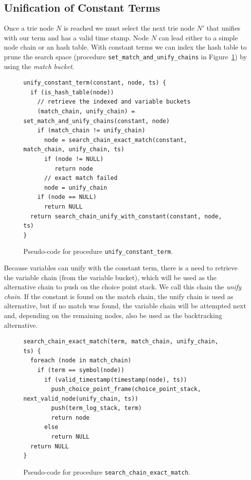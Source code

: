 \subsection{Unification of Constant Terms}

Once a trie node $N$ is reached we must select the next trie node $N'$ that unifies with our
term and has a valid time stamp. Node $N$ can lead either to a simple node chain or an hash table.
With constant terms we can index the hash table to prune the search space
(procedure \texttt{set\_match\_and\_unify\_chains} in Figure~\ref{fig:unify_constant_term})
by using the \textit{match bucket}.

\begin{figure}[ht]
\begin{Verbatim}
unify_constant_term(constant, node, ts) {
  if (is_hash_table(node))
    // retrieve the indexed and variable buckets
    (match_chain, unify_chain) = set_match_and_unify_chains(constant, node)
    if (match_chain != unify_chain)
      node = search_chain_exact_match(constant, match_chain, unify_chain, ts)
      if (node != NULL)
         return node
      // exact match failed
      node = unify_chain
    if (node == NULL)
      return NULL
  return search_chain_unify_with_constant(constant, node, ts)
}
\end{Verbatim}
\caption{Pseudo-code for procedure \texttt{unify\_constant\_term}.}
\label{fig:unify_constant_term}
\end{figure}

Because variables can unify with the constant term, there is a need to retrieve the variable chain
(from the variable bucket), which will be used as the alternative chain to push on the choice point stack.
We call this chain the \textit{unify chain}. If the constant is found on the match chain,
the unify chain is used as alternative, but if no match was found, the variable chain will be attempted
next and, depending on the remaining nodes, also be used as the backtracking alternative.

\begin{figure}[ht]
\begin{Verbatim}
search_chain_exact_match(term, match_chain, unify_chain, ts) {
  foreach (node in match_chain)
    if (term == symbol(node))
      if (valid_timestamp(timestamp(node), ts))
        push_choice_point_frame(choice_point_stack, next_valid_node(unify_chain, ts))
        push(term_log_stack, term)
        return node
      else
        return NULL
  return NULL
}
\end{Verbatim}
\caption{Pseudo-code for procedure \texttt{search\_chain\_exact\_match}.}
\label{fig:search_chain_exact_match}
\end{figure}

